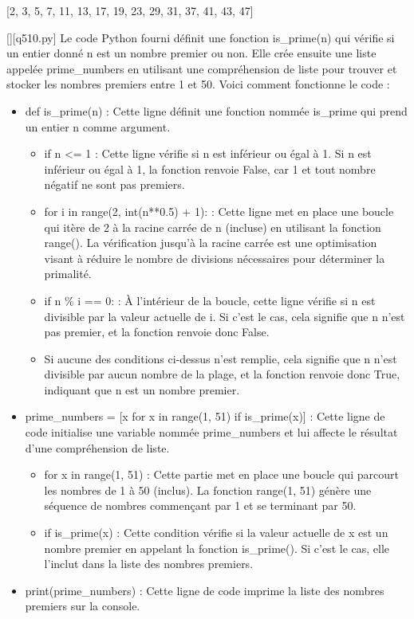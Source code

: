 [2, 3, 5, 7, 11, 13, 17, 19, 23, 29, 31, 37, 41, 43, 47]
        \par
        \begin{solution}
            \renewcommand{\nomfichier}{q510.py}
            \pythonfile{\chemincode \nomfichier}[][\nomfichier]
            Le code Python fourni définit une fonction is\_prime(n) qui vérifie si un entier donné n est un nombre premier ou non. Elle crée ensuite une liste appelée prime\_numbers en utilisant une compréhension de liste pour trouver et stocker les nombres premiers entre 1 et 50. Voici comment fonctionne le code :
\begin{itemize}
    \item def is\_prime(n) : Cette ligne définit une fonction nommée is\_prime qui prend un entier n comme argument.
\begin{itemize}
	\item         if n <= 1 : Cette ligne vérifie si n est inférieur ou égal à 1. Si n est inférieur ou égal à 1, la fonction renvoie False, car 1 et tout nombre négatif ne sont pas premiers.
	\item         for i in range(2, int(n**0.5) + 1): : Cette ligne met en place une boucle qui itère de 2 à la racine carrée de n (incluse) en utilisant la fonction range(). La vérification jusqu'à la racine carrée est une optimisation visant à réduire le nombre de divisions nécessaires pour déterminer la primalité.
	\item         if n \% i == 0: : À l'intérieur de la boucle, cette ligne vérifie si n est divisible par la valeur actuelle de i. Si c'est le cas, cela signifie que n n'est pas premier, et la fonction renvoie donc False.
	\item         Si aucune des conditions ci-dessus n'est remplie, cela signifie que n n'est divisible par aucun nombre de la plage, et la fonction renvoie donc True, indiquant que n est un nombre premier.
\end{itemize}
    \item prime\_numbers = [x for x in range(1, 51) if is\_prime(x)] : Cette ligne de code initialise une variable nommée prime\_numbers et lui affecte le résultat d'une compréhension de liste.
        \begin{itemize}
        	\item for x in range(1, 51) : Cette partie met en place une boucle qui parcourt les nombres de 1 à 50 (inclus). La fonction range(1, 51) génère une séquence de nombres commençant par 1 et se terminant par 50.
        	\item         if is\_prime(x) : Cette condition vérifie si la valeur actuelle de x est un nombre premier en appelant la fonction is\_prime(). Si c'est le cas, elle l'inclut dans la liste des nombres premiers.
        \end{itemize}
    \item print(prime\_numbers) : Cette ligne de code imprime la liste des nombres premiers sur la console.
   \end{itemize}
        \end{solution}
        

